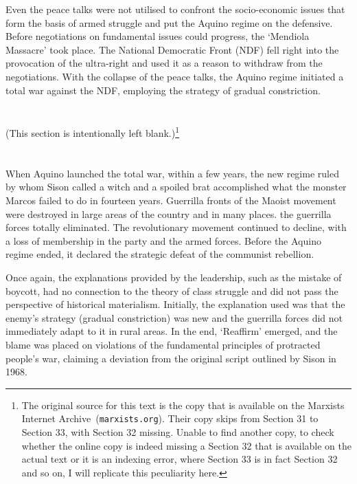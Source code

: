 Even the peace talks were not utilised 
to confront the socio-economic issues 
that form the basis of armed struggle 
and put the Aquino regime on the defensive. 
Before negotiations on fundamental issues could progress, 
the `Mendiola Massacre' took place. 
The National Democratic Front (NDF) fell right into 
the provocation of the ultra-right 
and used it as a reason to withdraw from the negotiations. 
With the collapse of the peace talks, 
the Aquino regime initiated a total war against the NDF, 
employing the strategy of gradual constriction.

\section{}
(This section is intentionally left blank.)\footnote{The original source for this text
is the copy that is available on the Marxists Internet Archive~(\texttt{marxists.org}).
Their copy skips from Section 31 to Section 33, with Section 32 missing. 
Unable to find another copy, 
to check whether the online copy is indeed missing a Section 32 
that is available on the actual text
or it is an indexing error, where Section 33 is in fact Section 32 and so on, 
I will replicate this peculiarity here.}

\section{}
When Aquino launched the total war, 
within a few years, 
the new regime ruled by whom Sison called a witch and a spoiled brat 
accomplished what the monster Marcos failed to do in fourteen years. 
Guerrilla fronts of the Maoist movement 
were destroyed in large areas of the country 
and in many places.
the guerrilla forces totally eliminated. 
The revolutionary movement continued to decline, 
with a loss of membership in the party and the armed forces. 
Before the Aquino regime ended, 
it declared the strategic defeat of the communist rebellion.

Once again, 
the explanations provided by the leadership, 
such as the mistake of boycott, 
had no connection to the theory of class struggle 
and did not pass the perspective of historical materialism. 
Initially, 
the explanation used was that the enemy's strategy (gradual constriction) 
was new and the guerrilla forces did not immediately adapt to it in rural areas. 
In the end, `Reaffirm' emerged, 
and the blame was placed on violations 
of the fundamental principles of protracted people's war, 
claiming a deviation from the original script outlined by Sison in 1968.

